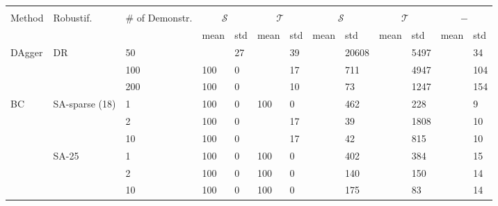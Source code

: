\begin{tabular}{|P{0.6cm}P{1.1cm}P{0.75cm}||P{0.5cm}P{0.5cm}|P{0.5cm}P{0.5cm}|P{0.5cm}P{0.5cm}|P{0.5cm}P{0.5cm}|P{0.5cm}P{0.5cm}|}%
\hline
{}     & 
{}     & 
{}     & 
 & 
 & 
\\
Method & 
Robustif. & 
\# of Demonstr. & 
 & 
 & 
 & 
 &
\\
&       & {} &    mean & std & mean & std &  mean &   std &  mean &   std &        mean & std \\
\hline
\hline
DAgger & DR    & 50  &       &  27 &    &  39 &        & 20608 &   &  5497 &  &  34 \\
       &       & 100 &     100 &   0 &    &  17 &         &   711 &   &  4947 &  & 104 \\
       &       & 200 &     100 &   0 &    &  10 &          &    73 &    &  1247 &  & 154 \\
\hline
BC     & SA-sparse (18)&1& 100 &   0 &  100 &   0 &         &   462 &    &   228 &           &   9 \\
       &       & 2   &     100 &   0 &    &  17 &          &    39 &    &  1808 &           &  10 \\
       &       & 10  &     100 &   0 &    &  17 &          &    42 &    &   815 &          &  10 \\
       & SA-25 & 1   &     100 &   0 &  100 &   0 &         &   402 &    &   384 &           &  15 \\
       &       & 2   &     100 &   0 &  100 &   0 &         &   140 &    &   150 &           &  14 \\
       &       & 10  &     100 &   0 &  100 &   0 &         &   175 &     &    83 &          &  14 \\


\end{tabular}

